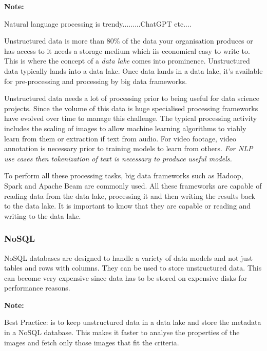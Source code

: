 \documentclass[a4paper, 11pt]{article}
\newenvironment{note}{
    \begin{siderule}
        \textbf{Note: }
        }{
    \end{siderule}}
\begin{document}
    \begin{note}
        Natural language processing is trendy.........ChatGPT etc....
    \end{note}

    Unstructured data is more than 80\% of the data your organisation produces or has access to it needs a storage medium which iis economical easy to write to.
    This is where the concept of a \textit{data lake} comes into prominence.
    Unstructured data typically lands into a data lake.
    Once data lands in a data lake, it's available for pre-processing and processing by big data frameworks.

    Unstructured data needs a lot of processing prior to being useful for data science projects.
    Since the volume of this data is huge specialised processing frameworks have evolved over time to manage this challenge.
    The typical processing activity includes the scaling of images to allow machine learning algorithms to viably learn from them or extraction if text from audio.
    For video footage, video annotation is necessary prior to training models to learn from others.
    \textit{For NLP use cases then tokenization of text is necessary to produce useful models.}

    To perform all these processing tasks, big data frameworks such as Hadoop, Spark and Apache Beam are commonly used.
    All these frameworks are capable of reading data from the data lake, processing it and then writing the results back to the data lake.
    It is important to know that they are capable or reading and writing to the data lake.

    \subsubsection{NoSQL}
    NoSQL databases are designed to handle a variety of data models and not just tables and rows with columns.
    They can be used to store unstructured data.
    This can become very expensive since data has to be stored on expensive disks for performance reasons.

    \begin{note}
        Best Practice: is to keep unstructured data in a data lake and store the metadata in a NoSQL database.
        This makes it faster to analyse the properties of the images and fetch only those images that fit the criteria.
    \end{note}
\end{document}
